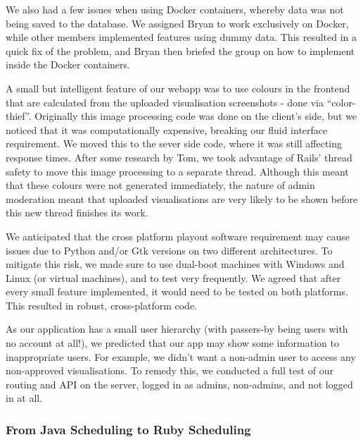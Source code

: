 \documentclass[a4paper, titlepage]{article}
\begin{document}
We also had a few issues when using Docker containers, whereby data was not being saved to the database.
We assigned Bryan to work exclusively on Docker, while other members implemented features using dummy 
data. This resulted in a quick fix of the problem, and Bryan then briefed the group on how to implement
inside the Docker containers. 

A small but intelligent feature of our webapp was to use colours in the frontend that are calculated 
from the uploaded visualisation screenshots - done via ``color-thief''. Originally this image
processing code was done on the client's side, but we noticed that it was computationally expensive,
breaking our fluid interface requirement. We moved this to the sever side code, where it was still 
affecting response times. After some research by Tom, we took advantage of Rails' thread safety to move
this image processing to a separate thread. Although this meant that these colours were not generated 
immediately, the nature of admin moderation meant that uploaded visualisations are very likely to be 
shown before this new thread finishes its work.



We anticipated that the cross platform playout software requirement may cause issues due to Python
and/or Gtk versions on two different architectures. To mitigate this risk, we made sure to use dual-boot
machines with Windows and Linux (or virtual machines), and to test very frequently. We agreed that after
every small feature implemented, it would need to be tested on both platforms. This resulted in robust, 
cross-platform code.


As our application has a small user hierarchy (with passers-by being users with no account at all!), we 
predicted that our app may show some information to inappropriate users. For example, we didn't want a 
non-admin user to access any non-approved visualisations. To remedy this, we conducted a full test of
our routing and API on the server, logged in as admins, non-admins, and not logged in at all. 




\subsubsection{From Java Scheduling to Ruby Scheduling}
\end{document}
